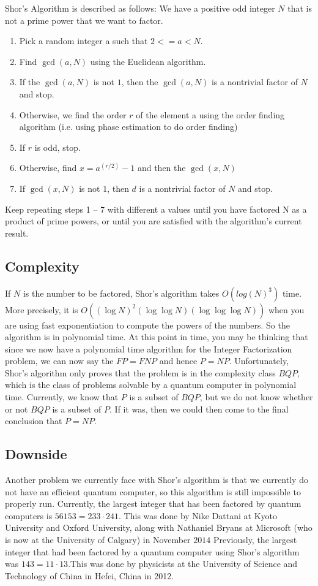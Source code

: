 	Shor’s Algorithm is described as follows: We have a positive odd integer $N$ that is not a prime power that we want to factor.

	\begin{enumerate}
		\item Pick a random integer a such that $2<= a < N$.
		\item Find $\gcd(a, N)$ using the Euclidean algorithm.
		\item If the $\gcd(a, N)$ is not $1$, then the $\gcd(a, N)$ is a nontrivial factor of $N$ and stop.
		\item Otherwise, we find the order $r$ of the element a using the order finding algorithm (i.e. using phase estimation to do order finding)
		\item If $r$ is odd, stop.
		\item Otherwise, find $x = a^(r/2) - 1$ and then the $\gcd(x, N)$
		\item If $\gcd(x, N)$ is not $1$, then $d$ is a nontrivial factor of $N$ and stop.
	\end{enumerate}

	Keep repeating steps 1 – 7 with different a values until you have factored N as a product of prime powers, or until you are satisfied with the algorithm’s current result.

\subsection{Complexity}

	If $N$ is the number to be factored, Shor’s algorithm takes $O(log(N)^3)$ time. More precisely, it is $O((\log N)^2(\log \log N)(\log \log \log N))$ when you are using fast exponentiation to compute the powers of the numbers. So the algorithm is in polynomial time. At this point in time, you may be thinking that since we now have a polynomial time algorithm for the Integer Factorization problem, we can now say the $FP = FNP$ and hence $P = NP$. Unfortunately, Shor’s algorithm only proves that the problem is in the complexity class $BQP$, which is the class of problems solvable by a quantum computer in polynomial time. Currently, we know that $P$ is a subset of $BQP$, but we do not know whether or not $BQP$ is a subset of $P$. If it was, then we could then come to the final conclusion that $P = NP$. 

\subsection{Downside}
	Another problem we currently face with Shor’s algorithm is that we currently do not have an efficient quantum computer, so this algorithm is still impossible to properly run. Currently, the largest integer that has been factored by quantum computers is $56153 = 233 \cdot 241$. This was done by Nike Dattani at Kyoto University and Oxford University, along with Nathaniel Bryans at Microsoft (who is now at the University of Calgary) in November $2014$ Previously, the largest integer that had been factored by a quantum computer using Shor’s algorithm was $143 = 11 \cdot 13$.This was done by physicists at the University of Science and Technology of China in Hefei, China in 2012. 
